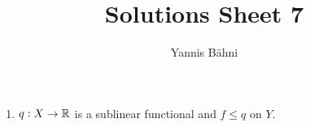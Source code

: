 

\title{Solutions Sheet 7}
\author{Yannis B\"{a}hni}
\address[Yannis B\"{a}hni]{University of Zurich, R\"{a}mistrasse 71, 8006 Zurich}



\maketitle
\thispagestyle{fancy}

\setcounter{section}{1}

\begin{enumerate}[label = \textbf{Exercise \arabic*.},wide = 0pt, itemsep = 1.5ex]
	\item
		\begin{lemma}
			$q : X \to \mathbb{R}$ is a sublinear functional and $f \leq q$ on $Y$.
		\end{lemma}


\end{enumerate}
